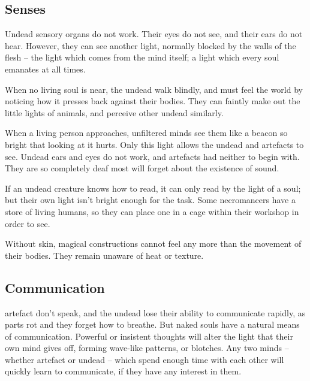 \begin{multicols}{2}

\subsection[The undead are deaf and blind, but see by the light of living souls]{Senses}
\label{undead_senses}
\label{artefact_senses}

Undead sensory organs do not work.
Their eyes do not see, and their ears do not hear.
However, they can see another light, normally blocked by the walls of the flesh -- the light which comes from the mind itself; a light which every soul emanates at all times.

When no living soul is near, the undead walk blindly, and must feel the world by noticing how it presses back against their bodies.
They can faintly make out the little lights of animals, and perceive other undead similarly.

When a living person approaches, unfiltered minds see them like a beacon so bright that looking at it hurts.
Only this light allows the undead and \glspl{artefact} to see.
Undead ears and eyes do not work, and \glspl{artefact} had neither to begin with.
They are so completely deaf most will forget about the existence of sound.

If an undead creature knows how to read, it can only read by the light of a soul; but their own light isn't bright enough for the task.
Some necromancers have a store of living humans, so they can place one in a cage within their workshop in order to see.

Without skin, magical constructions cannot feel any more than the movement of their bodies.
They remain unaware of heat or texture.

\subsection{Communication}
\label{dead_communication}

\Gls{artefact} don't speak, and the undead lose their ability to communicate rapidly, as parts rot and they forget how to breathe.
But naked souls have a natural means of communication.
Powerful or insistent thoughts will alter the light that their own mind gives off, forming wave-like patterns, or blotches.
Any two minds -- whether \gls{artefact} or undead -- which spend enough time with each other will quickly learn to communicate, if they have any interest in them.

\end{multicols}

